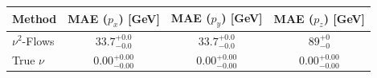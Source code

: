     \begin{tabular}{lccc}
        \toprule
        Method & MAE ($p_x$) [GeV] & MAE ($p_y$) [GeV] & MAE ($p_z$) [GeV] \\
        \midrule
        $\nu^2$-Flows & $33.7_{-0.0}^{+0.0}$ & $33.7_{-0.0}^{+0.0}$ & $89_{-0}^{+0}$ \\
        True $\nu$ & $0.00_{-0.00}^{+0.00}$ & $0.00_{-0.00}^{+0.00}$ & $0.00_{-0.00}^{+0.00}$ \\
        \bottomrule
    \end{tabular}